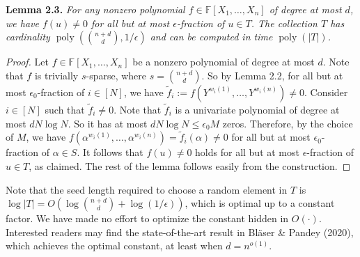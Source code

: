 \documentclass[10pt,a4paper]{article}
\newcommand{\FF}{\mathbb F}
\newenvironment{result}[1]{\par\medskip\noindent\textbf{#1.}\itshape}{\par\medskip}
\begin{document}
\begin{result}{Lemma 2.3}
For any nonzero polynomial $f\in\FF[X_1,\ldots,X_n]$ of degree at most $d$, we have $f(u)\ne0$ for all but at most $\epsilon$-fraction of $u\in T$. The collection $T$ has cardinality $\operatorname{poly}(\binom{n+d}{d},1/\epsilon)$ and can be computed in time $\operatorname{poly}(|T|)$.
\end{result}
\begin{proof}
Let $f\in\FF[X_1,\ldots,X_n]$ be a nonzero polynomial of degree at most $d$. Note that $f$ is trivially $s$-sparse, where $s=\binom{n+d}{d}$. So by Lemma 2.2, for all but at most $\epsilon_0$-fraction of $i\in[N]$, we have $\widetilde f_i:=f(Y^{w_i(1)},\ldots,Y^{w_i(n)})\ne0$. Consider $i\in[N]$ such that $\widetilde f_i\ne0$. Note that $\widetilde f_i$ is a univariate polynomial of degree at most $dN\log N$. So it has at most $dN\log N\le\epsilon_0M$ zeros. Therefore, by the choice of $M$, we have $f(\alpha^{w_i(1)},\ldots,\alpha^{w_i(n)})=\widetilde f_i(\alpha)\ne0$ for all but at most $\epsilon_0$-fraction of $\alpha\in S$. It follows that $f(u)\ne0$ holds for all but at most $\epsilon$-fraction of $u\in T$, as claimed. The rest of the lemma follows easily from the construction.
\end{proof}
Note that the seed length required to choose a random element in $T$ is $\log|T|=O(\log\binom{n+d}{d}+\log(1/\epsilon))$, which is optimal up to a constant factor. We have made no effort to optimize the constant hidden in $O(\cdot)$. Interested readers may find the state-of-the-art result in Bl\"aser \& Pandey (2020), which achieves the optimal constant, at least when $d=n^{o(1)}$.
\end{document}
